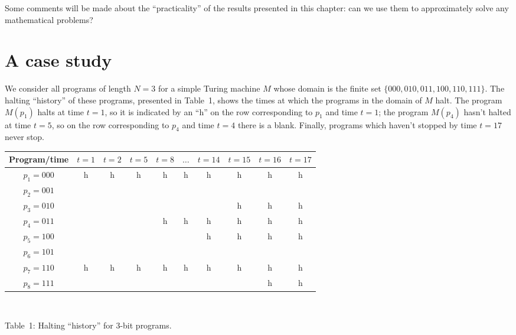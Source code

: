 \documentclass[12pt,twoside,openright]{report}
\begin{document}
Some comments will be made about the ``practicality'' of the results presented in this chapter: can we use them to approximately solve any mathematical problems?

\section{A case study}

We consider all programs of length $N=3$ for a simple Turing machine $M$  whose domain is the finite set $\{000,010,011,100,110,111\}$. The halting ``history'' of these programs, presented in Table~1, shows the times at which the programs in the domain of $M$ halt. The program $M(p_{1})$ halts at time $t=1$, so it is indicated by an ``h'' on the row corresponding to $p_{1}$ and time $t=1$; the program $M(p_{4})$ hasn't halted at time $t=5$, so on the row corresponding to $p_{4}$ and time $t=4$ there is a blank. Finally, programs which haven't stopped by time $t=17$ never stop.

\begin{center}
\begin{tabular}{|c|c|c|c|c|c|c|c|c|c|}\hline Program/time & $t=1$ & $t=2$ & $t=5$ & $t=8$ & $\ldots$ & $ t=14$ & $t=15$ & $t=16$ & $t=17$\\
\hline
$p_{1}=000$ & h & h & h & h & h & h & h & h & h \\
\hline
$p_{2}=001$ &   &   &   &   &   &   &   &   &  \\
\hline
$p_{3}=010$ &   &   &   &   &   &   & h & h & h \\
\hline
$p_{4}=011$ &   &   &   & h & h & h & h & h & h \\
\hline                              
$p_{5}=100$ &   &   &   &   &   & h & h & h & h \\
\hline
$p_{6}=101$ &   &   &   &   &   &   &   &   &  \\
\hline
$p_{7}=110$ & h & h & h & h & h & h & h & h & h \\
\hline
$p_{8}=111$ &   &   &   &   &   &   &   & h & h\\
\hline\end{tabular}\\

\bigskip

Table~1:  Halting  ``history'' for 3-bit programs.
\end{center}
\end{document}
